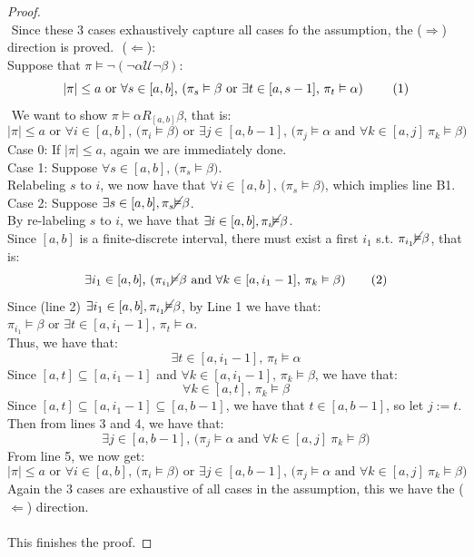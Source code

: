 \documentclass[runningheads]{llncs}
\begin{document}
\begin{proof}
\[\]
$ $ \newline
\indent Since these $3$ cases exhaustively capture all cases fo the assumption, the ($\Rightarrow$) direction is proved.
$ $ \newline
\noindent ($\Leftarrow$):\\
\indent Suppose that $\pi \vDash \neg (\neg \alpha \mathcal{U} \neg \beta)$:
\[
|\pi| \le a \text{ or } \forall s \in [a,b] \text{, (} \pi_s \vDash \beta \text{ or } \exists t \in [a, s-1] \text{, } \pi_t \vDash \alpha \text{) \tag{1}}
\]
$ $ \newline
\indent We want to show $\pi \vDash \alpha R_{[a,b]} \beta$, that is:
\[ |\pi| \leq a \text{ or } \forall i \in [a,b] \text{, (} \pi_i \vDash \beta \text{) or } \exists j \in [a,b-1] \text{, (} \pi_j \vDash \alpha \text{ and } \forall k \in [a, j] \ \pi_k \vDash \beta \text{)} \tag{B1} \]
\indent Case 0: If $|\pi| \leq a$, again we are immediately done. \\
\indent Case 1: Suppose $\forall s \in [a,b] \text{, (} \pi_s \vDash \beta \text{)}$.\\ 
\indent \indent Relabeling $s$ to $i$, we now have that $\forall i \in [a, b] \text{, (}\pi_s \vDash \beta \text{)}$, which implies line B1. \\
\indent Case 2: Suppose $\exists s \in [a,b], \pi_s \cancel{\vDash} \beta$.\\
\indent \indent By re-labeling $s$ to $i$, we have that $\exists i \in [a,b], \pi_i \cancel{\vDash} \beta$.\\
\indent \indent Since $[a,b]$ is a finite-discrete interval, there must exist a first $i_1$ s.t. $\pi_{i_1} \cancel{\vDash} \beta$, that is:
\[ 
\exists i_1 \in [a,b]\text{, (}  \pi_{i_1} \cancel{\vDash} \beta  \text{ and }  \forall k \in [a, i_1 - 1] \text{, } \pi_{k} \vDash \beta \text{)}
\tag{2}\]
\indent \indent Since (line 2) $\exists i_1 \in [a,b], \pi_{i_1} \cancel{\vDash} \beta$, by Line 1 we have that: $\pi_{i_1} \vDash \beta \text{ or } \exists t \in [a, i_1 - 1] \text{, } \pi_t \vDash \alpha$.\\
\indent \indent Thus, we have that: 
\[
\exists t \in [a, i_1 - 1] \text{, } \pi_t \vDash \alpha \tag{3}
\]
\indent \indent Since  $[a, t] \subseteq [a, i_1 - 1]$ and $\forall k \in [a, i_1 - 1] \text{, } \pi_{k} \vDash \beta$, we have that:
\[ 
\forall k \in [a, t]\text{, } \pi_{k} \vDash \beta \tag{4}
\]
\indent \indent Since $[a,t] \subseteq [a, i_1 - 1] \subseteq [a,b-1]$, we have that $t \in [a,b-1]$, so let $j := t$.
\indent \indent Then from lines 3 and 4, we have that:
\[
\exists j \in [a,b-1] \text{, (} \pi_j \vDash \alpha \text{ and } \forall k \in [a, j] \ \pi_k \vDash \beta \text{)} \tag{5}
\]
\indent \indent From line 5, we now get:
\[ 
|\pi| \leq a \text{ or } \forall i \in [a,b] \text{, (} \pi_i \vDash \beta \text{) or } \exists j \in [a,b-1] \text{, (} \pi_j \vDash \alpha \text{ and } \forall k \in [a, j] \ \pi_k \vDash \beta \text{)} \tag{B1}
\]
\indent Again the 3 cases are exhaustive of all cases in the assumption, this we have the ($\Leftarrow$) direction.\\
\\
This finishes the proof.
\end{proof}
\end{document}
